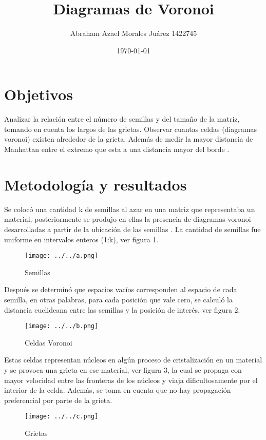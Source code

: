 \documentclass{article}
\author{Abraham Azael Morales Juárez  1422745}
\title{Diagramas de Voronoi}
\date{\today}
\begin{document}
\maketitle


\section{Objetivos}
Analizar la relación entre el número de semillas y del tamaño de la matriz, tomando en cuenta los largos de las grietas. 
Observar cuantas celdas (diagramas voronoi) existen alrededor de la grieta. Además de medir la mayor distancia de Manhattan entre el extremo que esta a una distancia mayor del borde \cite{REF1}.

\section{Metodología y resultados}
Se colocó una cantidad k de semillas al azar en una matriz que representaba un material, posteriormente se produjo en ellas la presencia de diagramas voronoi desarrolladas a partir de la ubicación de las semillas \cite{REF2}. La cantidad de semillas fue uniforme en intervalos enteros (1:k), ver figura 1.

\begin{figure}[H]
\texttt{[image: ../../a.png]}
\centering
\caption{Semillas}
\end{figure}

  
 
Después se determinó que espacios vacíos corresponden al espacio de cada semilla, en otras palabras, para cada posición que vale cero, se calculó la distancia euclideana entre las semillas y la posición de interés, ver figura 2.

\begin{figure}[H]
\texttt{[image: ../../b.png]}
\centering
\caption{Celdas Voronoi}
\end{figure}


Estas celdas representan núcleos en algún proceso de cristalización en un material y se provoca una grieta en ese material, ver figura 3, la cual se propaga con mayor velocidad entre las fronteras de los núcleos y viaja dificultosamente por el interior de la celda. Además, se toma en cuenta que no hay propagación preferencial por parte de la grieta.

\begin{figure}[H]
\texttt{[image: ../../c.png]}
\centering
\caption{Grietas}
\end{figure}
\end{document}

